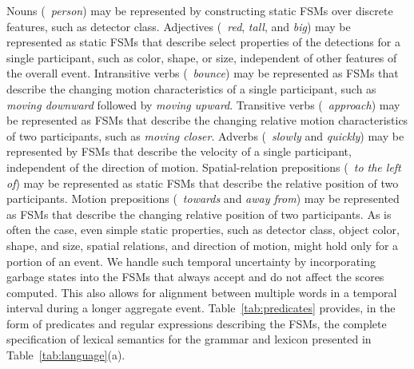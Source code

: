 \begin{table}[t]
  \vspace*{-2ex}
  \caption{(a) The grammar for our lexicon of 19 lexical entries (2
    determiners, 2 adjectives, 5 nouns, 2 spatial relations, 4 verbs, 2
    adverbs, and 2 motion prepositions).
    Note that the grammar allows for infinite recursion in the noun phrase.
    (b) The theta grid, specifying the number of arguments and
    roles such arguments refer to, for our lexicon.
    (c) A selection of sentences drawn from the grammar based on which we
    collected (multiple instances of) videos for our experimental corpus..  }
  \label{tab:language}
  \vspace*{-3ex}
\end{table}

Nouns (\eg\ \emph{person}) may be represented by constructing static FSMs over
discrete features, such as detector class.
%
Adjectives (\eg\ \emph{red}, \emph{tall}, and \emph{big}) may be represented as
static FSMs that describe select properties of the detections for a single
participant, such as color, shape, or size, independent of other features of
the overall event.
%
Intransitive verbs (\eg\ \emph{bounce}) may be represented as FSMs that
describe the changing motion characteristics of a single participant, such as
\emph{moving downward} followed by \emph{moving upward}.
%
Transitive verbs (\eg\ \emph{approach}) may be represented as FSMs that
describe the changing relative motion characteristics of two participants, such
as \emph{moving closer}.
%
Adverbs (\eg\ \emph{slowly} and \emph{quickly}) may be represented by FSMs that
describe the velocity of a single participant, independent of the direction of
motion.
%
Spatial-relation prepositions (\eg\ \emph{to the left of}) may be represented
as static FSMs that describe the relative position of two participants.
%
Motion prepositions (\eg\ \emph{towards} and \emph{away from}) may be
represented as FSMs that describe the changing relative position of two
participants.
%
As is often the case, even simple static properties, such as detector class,
object color, shape, and size, spatial relations, and direction of motion,
might hold only for a portion of an event.
%
We handle such temporal uncertainty by incorporating garbage states into the
FSMs that always accept and do not affect the scores computed.
%
This also allows for alignment between multiple words in a temporal interval
during a longer aggregate event.
%
Table~\ref{tab:predicates} provides, in the form of predicates and regular
expressions describing the FSMs, the complete specification of lexical
semantics for the grammar and lexicon presented in Table~\ref{tab:language}(a).

